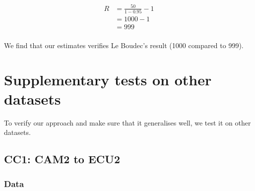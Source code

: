\documentclass{article}
\begin{document}
\begin{align*}
    R & = \frac{50}{1 - 0.95} - 1 \\
      & = 1000 - 1                \\
      & = 999                     \\
\end{align*}

We find that our estimates verifies Le Boudec's result (1000 compared to 999).

\newpage
\appendix
\section{Supplementary tests on other datasets}
To verify our approach and make sure that it generalises well, we test it on other datasets.

\subsection{CC1: CAM2 to ECU2}
\subsubsection{Data}
\end{document}
